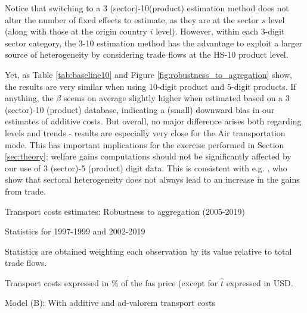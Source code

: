 \documentclass[a4paper,11pt]{article}
\begin{document}
Notice that switching to a 3 (sector)-10(product) estimation method does not alter the number of fixed effects to estimate, as they are at the sector $s$ level (along with those at the origin country $i$ level). However, within each 3-digit sector category, the 3-10 estimation method has the advantage to exploit a larger source of heterogeneity by considering trade flows at the HS-10 product level.

Yet, as Table \ref{tab:baseline10} and 	Figure \ref{fig:robustness_to_agregation} show, the results are very similar when using 10-digit product and 5-digit products. If anything, the $\beta$ seems on average slightly higher when estimated based on a 3 (sector)-10 (product) database, indicating a (small) downward bias in our estimates of additive costs. But overall, no major difference arises both regarding levels and trends - results are especially very close for the Air transportation mode. This has important implications for the exercise performed in Section \ref{sec:theory}: welfare gains computations should not be significantly affected by our use of 3 (sector)-5 (product) digit data. This is consistent with e.g. \citet{Giri_et_al2021}, who show that sectoral heterogeneity does not always lead to an increase in the gains from trade.

\begin{table}[htbp]
	\centering
	\caption{Transport costs estimates: Robustness to aggregation (2005-2019)} \vspace{5mm} \label{tab:baseline10}
	
	\begin{tablenotes}
		\scriptsize
		\item Statistics for 1997-1999 and 2002-2019
		\item Statistics are obtained weighting each observation by its value relative to total trade flows.
        \item Transport costs expressed in \% of the fas price (except for $\widehat{t}$ expressed in USD.
		\item Model (B): With additive and ad-valorem transport costs
	\end{tablenotes}
\end{table}
\end{document}
